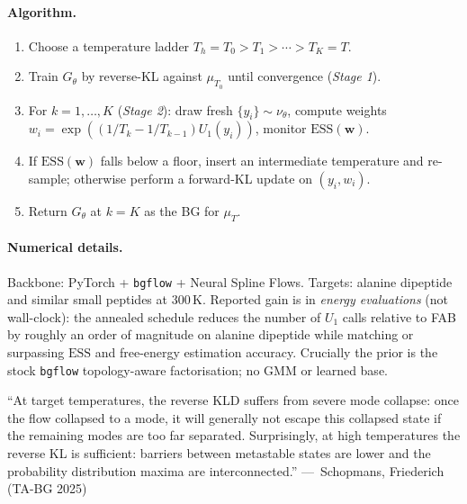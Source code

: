 \documentclass[11pt,letterpaper]{article}
\newcommand{\ESS}{\mathrm{ESS}}
\theoremstyle{plain}
\begin{document}
\paragraph{Algorithm.}
\begin{enumerate}\setlength{\itemsep}{1pt}
  \item Choose a temperature ladder $T_h=T_0>T_1>\cdots>T_K=T$.
  \item Train $G_\theta$ by reverse-KL against $\mu_{T_0}$ until convergence
    (\emph{Stage 1}).
  \item For $k=1,\ldots,K$ (\emph{Stage 2}): draw fresh $\{y_i\}\sim\nu_\theta$,
    compute weights $w_i=\exp((1/T_k-1/T_{k-1})U_1(y_i))$, monitor
    $\ESS(\mathbf w)$.
  \item If $\ESS(\mathbf w)$ falls below a floor, insert an intermediate
    temperature and re-sample; otherwise perform a forward-KL update on
    $(y_i,w_i)$.
  \item Return $G_\theta$ at $k=K$ as the BG for $\mu_T$.
\end{enumerate}

\paragraph{Numerical details.} Backbone: PyTorch + \texttt{bgflow} + Neural
Spline Flows. Targets: alanine dipeptide and similar small peptides at
$300\,\mathrm K$. Reported gain is in \emph{energy evaluations} (not
wall-clock): the annealed schedule reduces the number of $U_1$ calls relative
to FAB by roughly an order of magnitude on alanine dipeptide while matching or
surpassing $\ESS$ and free-energy estimation accuracy. Crucially the prior is
the stock \texttt{bgflow} topology-aware factorisation; no GMM or learned base.

\begin{killerquote}
``At target temperatures, the reverse KLD suffers from severe mode collapse:
once the flow collapsed to a mode, it will generally not escape this collapsed
state if the remaining modes are too far separated. Surprisingly, at high
temperatures the reverse KL is sufficient: barriers between metastable states
are lower and the probability distribution maxima are interconnected.''
\hfill ---~Schopmans, Friederich (TA-BG 2025)
\end{killerquote}
\end{document}
